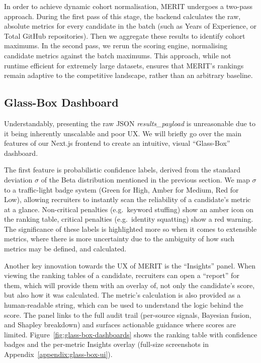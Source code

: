 In order to achieve dynamic cohort normalisation, MERIT undergoes a two-pass approach. During the first pass of this stage, the backend
calculates the raw, absolute metrics for every candidate in the batch (such as Years of Experience, or Total GitHub repositories). Then
we aggregate these results to identify cohort maximums. In the second pass, we rerun the scoring engine, normalising candidate metrics against
the batch maximums. This approach, while not runtime efficient for extremely large datasets, ensures that MERIT's rankings remain adaptive
to the competitive landscape, rather than an arbitrary baseline.

\subsection{Glass-Box Dashboard}
\label{subsec:glass-box-dashboard}
Understandably, presenting the raw JSON \textit{results\_payload} is unreasonable due to it being inherently unscalable and poor UX.
We will briefly go over the main features of our Next.js frontend to create an intuitive, visual ``Glass-Box'' dashboard.

The first feature is probabilistic confidence labels, derived from the standard deviation $\sigma$ of the Beta distribution mentioned
in the previous section. We map $\sigma$ to a traffic-light badge system (Green for High, Amber for Medium, Red for Low),
allowing recruiters to instantly scan the reliability of a candidate's metric at a glance.
Non-critical penalties (e.g.\ keyword stuffing) show an amber icon on the ranking table, critical penalties (e.g.\ identity squatting) show a red warning. The significance of these labels is highlighted
more so when it comes to extensible metrics, where there is more uncertainty due to the ambiguity of how such metrics may be defined,
and calculated.

Another key innovation towards the UX of MERIT is the ``Insights'' panel. When viewing the ranking tables of a candidate, recruiters can open
a ``report'' for them, which will provide them with an overlay of, not only the candidate's score, but also how it was calculated. The metric's
calculation is also provided as a human-readable string, which can be used to understand the logic behind the score.
The panel links to the full audit trail (per-source signals, Bayesian fusion, and Shapley breakdown) and surfaces actionable 
guidance where scores are limited.
Figure~\ref{fig:glass-box-dashboards} shows the ranking table with confidence 
badges and the per-metric Insights overlay (full-size screenshots in Appendix~\ref{appendix:glass-box-ui}).

